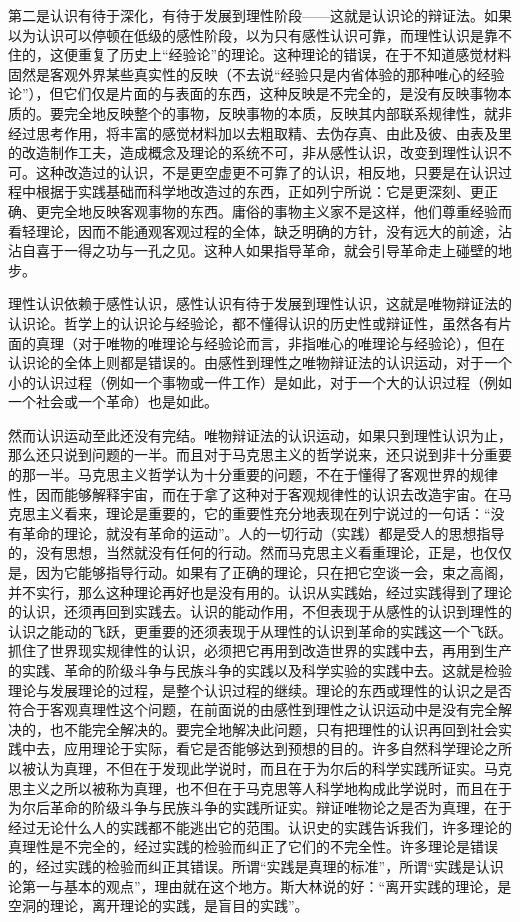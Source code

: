 第二是认识有待于深化，有待于发展到理性阶段——这就是认识论的辩证法。如果以为认识可以停顿在低级的感性阶段，以为只有感性认识可靠，而理性认识是靠不住的，这便重复了历史上“经验论”的理论。这种理论的错误，在于不知道感觉材料固然是客观外界某些真实性的反映（不去说“经验只是内省体验的那种唯心的经验论”），但它们仅是片面的与表面的东西，这种反映是不完全的，是没有反映事物本质的。要完全地反映整个的事物，反映事物的本质，反映其内部联系规律性，就非经过思考作用，将丰富的感觉材料加以去粗取精、去伪存真、由此及彼、由表及里的改造制作工夫，造成概念及理论的系统不可，非从感性认识，改变到理性认识不可。这种改造过的认识，不是更空虚更不可靠了的认识，相反地，只要是在认识过程中根据于实践基础而科学地改造过的东西，正如列宁所说：它是更深刻、更正确、更完全地反映客观事物的东西。庸俗的事物主义家不是这样，他们尊重经验而看轻理论，因而不能通观客观过程的全体，缺乏明确的方针，没有远大的前途，沾沾自喜于一得之功与一孔之见。这种人如果指导革命，就会引导革命走上碰壁的地步。

理性认识依赖于感性认识，感性认识有待于发展到理性认识，这就是唯物辩证法的认识论。哲学上的认识论与经验论，都不懂得认识的历史性或辩证性，虽然各有片面的真理（对于唯物的唯理论与经验论而言，非指唯心的唯理论与经验论），但在认识论的全体上则都是错误的。由感性到理性之唯物辩证法的认识运动，对于一个小的认识过程（例如一个事物或一件工作）是如此，对于一个大的认识过程（例如一个社会或一个革命）也是如此。

然而认识运动至此还没有完结。唯物辩证法的认识运动，如果只到理性认识为止，那么还只说到问题的一半。而且对于马克思主义的哲学说来，还只说到非十分重要的那一半。马克思主义哲学认为十分重要的问题，不在于懂得了客观世界的规律性，因而能够解释宇宙，而在于拿了这种对于客观规律性的认识去改造宇宙。在马克思主义看来，理论是重要的，它的重要性充分地表现在列宁说过的一句话：“没有革命的理论，就没有革命的运动”。人的一切行动（实践）都是受人的思想指导的，没有思想，当然就没有任何的行动。然而马克思主义看重理论，正是，也仅仅是，因为它能够指导行动。如果有了正确的理论，只在把它空谈一会，束之高阁，并不实行，那么这种理论再好也是没有用的。认识从实践始，经过实践得到了理论的认识，还须再回到实践去。认识的能动作用，不但表现于从感性的认识到理性的认识之能动的飞跃，更重要的还须表现于从理性的认识到革命的实践这一个飞跃。抓住了世界现实规律性的认识，必须把它再用到改造世界的实践中去，再用到生产的实践、革命的阶级斗争与民族斗争的实践以及科学实验的实践中去。这就是检验理论与发展理论的过程，是整个认识过程的继续。理论的东西或理性的认识之是否符合于客观真理性这个问题，在前面说的由感性到理性之认识运动中是没有完全解决的，也不能完全解决的。要完全地解决此问题，只有把理性的认识再回到社会实践中去，应用理论于实际，看它是否能够达到预想的目的。许多自然科学理论之所以被认为真理，不但在于发现此学说时，而且在于为尔后的科学实践所证实。马克思主义之所以被称为真理，也不但在于马克思等人科学地构成此学说时，而且在于为尔后革命的阶级斗争与民族斗争的实践所证实。辩证唯物论之是否为真理，在于经过无论什么人的实践都不能逃出它的范围。认识史的实践告诉我们，许多理论的真理性是不完全的，经过实践的检验而纠正了它们的不完全性。许多理论是错误的，经过实践的检验而纠正其错误。所谓“实践是真理的标准”，所谓“实践是认识论第一与基本的观点”，理由就在这个地方。斯大林说的好：“离开实践的理论，是空洞的理论，离开理论的实践，是盲目的实践”。

